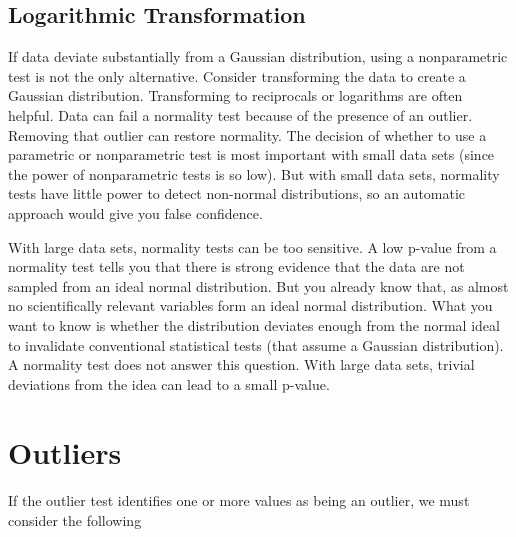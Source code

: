
\subsection{Logarithmic  Transformation}

If data deviate substantially from a Gaussian distribution, using a nonparametric test is not the only alternative. Consider transforming the data to create a Gaussian distribution. Transforming to reciprocals or logarithms are often helpful.
Data can fail a normality test because of the presence of an outlier. Removing that outlier can restore normality.
The decision of whether to use a parametric or nonparametric test is most important with small data sets (since the power of nonparametric tests is so low). But with small data sets, normality tests have little power to detect non-normal distributions, so an automatic approach would give you false confidence.

With large data sets, normality tests can be too sensitive. A low p-value from a normality test tells you that there is strong evidence that the data are not sampled from an ideal normal distribution. But you already know that, as almost no scientifically relevant variables form an ideal normal distribution. What you want to know is whether the distribution deviates enough from the normal ideal to invalidate conventional statistical tests (that assume a Gaussian distribution). A normality test does not answer this question. With large data sets, trivial deviations from the idea can lead to a small p-value.

\section{Outliers}
If the outlier test identifies one or more values as being an outlier, we must consider the following

